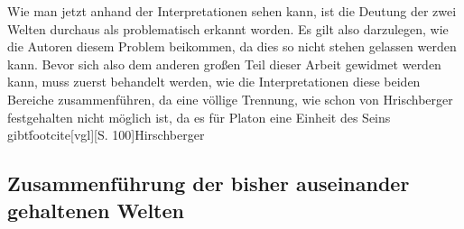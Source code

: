 Wie man jetzt anhand der Interpretationen sehen kann, ist die Deutung der zwei Welten durchaus als problematisch erkannt worden. Es gilt also darzulegen, wie die Autoren diesem Problem beikommen, da dies so nicht stehen gelassen werden kann. 
Bevor sich also dem anderen großen Teil dieser Arbeit gewidmet werden kann, muss zuerst behandelt werden, wie die Interpretationen diese beiden Bereiche zusammenführen, da eine völlige Trennung, wie schon von Hrischberger festgehalten nicht möglich ist, da es für Platon eine Einheit des Seins gibt\.footcite[vgl][S. 100]{Hirschberger}

\subsection{Zusammenführung der bisher auseinander gehaltenen Welten}

